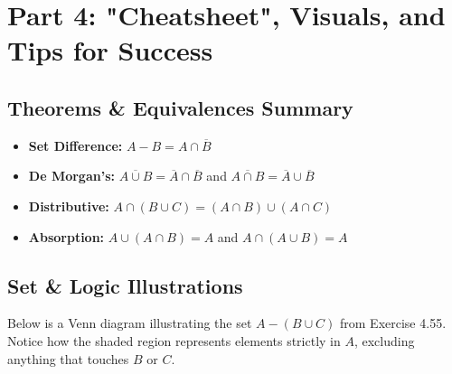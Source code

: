 \documentclass[11pt, a4paper]{article}
\theoremstyle{definition}
\theoremstyle{remark}
\begin{document}
\section{Part 4: "Cheatsheet", Visuals, and Tips for Success}

\subsection{Theorems \& Equivalences Summary}
\begin{itemize}
    \item \textbf{Set Difference:} $A - B = A \cap \overline{B}$
    \item \textbf{De Morgan's:} $\overline{A \cup B} = \overline{A} \cap \overline{B}$ \quad and \quad $\overline{A \cap B} = \overline{A} \cup \overline{B}$
    \item \textbf{Distributive:} $A \cap (B \cup C) = (A \cap B) \cup (A \cap C)$
    \item \textbf{Absorption:} $A \cup (A \cap B) = A$ \quad and \quad $A \cap (A \cup B) = A$
\end{itemize}

\subsection{Set \& Logic Illustrations}
Below is a Venn diagram illustrating the set $A - (B \cup C)$ from Exercise 4.55. Notice how the shaded region represents elements strictly in $A$, excluding anything that touches $B$ or $C$.

\begin{center}
\end{center}
\end{document}

